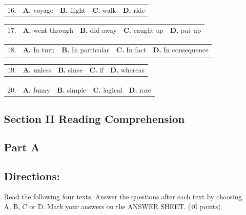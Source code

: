 \documentclass[UTF8,11pt]{ctexart}
\begin{document}
\noindent\begin{tabularx}{\linewidth}{@{}lXXXX@{}}16. & \textbf{A.} voyage & \textbf{B.} flight & \textbf{C.} walk & \textbf{D.} ride\\\end{tabularx}\par

\noindent\begin{tabularx}{\linewidth}{@{}lXXXX@{}}17. & \textbf{A.} went through & \textbf{B.} did away & \textbf{C.} caught up & \textbf{D.} put up\\\end{tabularx}\par

\noindent\begin{tabularx}{\linewidth}{@{}lXXXX@{}}18. & \textbf{A.} In turn & \textbf{B.} In particular & \textbf{C.} In fact & \textbf{D.} In consequence\\\end{tabularx}\par

\noindent\begin{tabularx}{\linewidth}{@{}lXXXX@{}}19. & \textbf{A.} unless & \textbf{B.} since & \textbf{C.} if & \textbf{D.} whereas\\\end{tabularx}\par

\noindent\begin{tabularx}{\linewidth}{@{}lXXXX@{}}20. & \textbf{A.} funny & \textbf{B.} simple & \textbf{C.} logical & \textbf{D.} rare\\\end{tabularx}\par

\subsection*{\textbf{Section II Reading Comprehension}}


\subsection*{\textbf{Part A}}


\subsection*{\textbf{Directions:}}


Read the following four texts. Answer the questions after each text by choosing A, B, C or D. Mark your answers on the ANSWER SHEET. (40 points)
\end{document}
